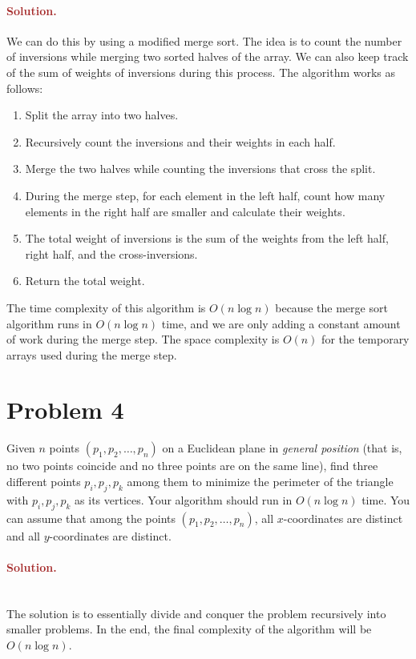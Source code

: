 \paragraph{\textcolor{brown}{Solution.}}
We can do this by using a modified merge sort. The idea is to count the number of inversions while merging two sorted halves of the array. We can also keep track of the sum of weights of inversions during this process.
The algorithm works as follows:
\begin{enumerate}
    \item Split the array into two halves.
    \item Recursively count the inversions and their weights in each half.
    \item Merge the two halves while counting the inversions that cross the split.
    \item During the merge step, for each element in the left half, count how many elements in the right half are smaller and calculate their weights.
    \item The total weight of inversions is the sum of the weights from the left half, right half, and the cross-inversions.
    \item Return the total weight.
    \end{enumerate}
The time complexity of this algorithm is $O(n \log n)$ because the merge sort algorithm runs in $O(n \log n)$ time, and we are only adding a constant amount of work during the merge step.
The space complexity is $O(n)$ for the temporary arrays used during the merge step.

\section*{Problem 4}
Given $n$ points $(p_1, p_2, \ldots, p_n)$ on a Euclidean plane in \emph{general position} (that is, no two points coincide and no three points are on the same line), find three different points $p_i, p_j, p_k$ among them to minimize the perimeter of the triangle with $p_i, p_j, p_k$ as its vertices. Your algorithm should run in $O(n \log n)$ time. You can assume that among the points $(p_1, p_2, \ldots, p_n)$, all $x$-coordinates are distinct and all $y$-coordinates are distinct.

\paragraph{\textcolor{brown}{Solution.}} \: \\
The solution is to essentially divide and conquer the problem recursively into smaller problems. In the end, the final complexity of the algorithm will be $O(n\log n)$. \\

